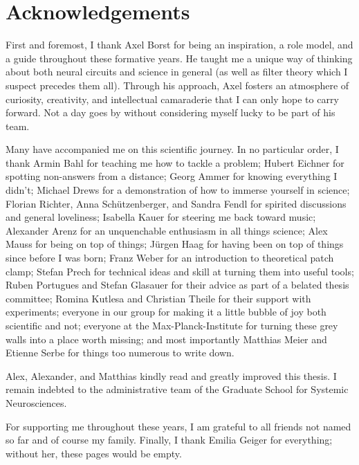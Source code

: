 
\chapter*{Acknowledgements}
\label{chp:ack}

First and foremost, I thank Axel Borst for being an inspiration, a role model, and a guide throughout these formative years. He taught me a unique way of thinking about both neural circuits and science in general (as well as filter theory which I suspect precedes them all). Through his approach, Axel fosters an atmosphere of curiosity, creativity, and intellectual camaraderie that I can only hope to carry forward. Not a day goes by without considering myself lucky to be part of his team.

Many have accompanied me on this scientific journey. In no particular order, I thank
Armin Bahl for teaching me how to tackle a problem;
Hubert Eichner for spotting non-answers from a distance;
Georg Ammer for knowing everything I didn't;
Michael Drews for a demonstration of how to immerse yourself in science;
Florian Richter, Anna Schützenberger, and Sandra Fendl for spirited discussions and general loveliness;
Isabella Kauer for steering me back toward music;
Alexander Arenz for an unquenchable enthusiasm in all things science;
Alex Mauss for being on top of things;
Jürgen Haag for having been on top of things since before I was born;
Franz Weber for an introduction to theoretical patch clamp;
Stefan Prech for technical ideas and skill at turning them into useful tools;
Ruben Portugues and Stefan Glasauer for their advice as part of a belated thesis committee;
Romina Kutlesa and Christian Theile for their support with experiments;
everyone in our group for making it a little bubble of joy both scientific and not;
everyone at the Max-Planck-Institute for turning these grey walls into a place worth missing;
and most importantly Matthias Meier and Etienne Serbe for things too numerous to write down.

Alex, Alexander, and Matthias kindly read and greatly improved this thesis. I remain indebted to the administrative team of the Graduate School for Systemic Neurosciences.

For supporting me throughout these years, I am grateful to all friends not named so far and of course my family. Finally, I thank Emilia Geiger for everything; without her, these pages would be empty.